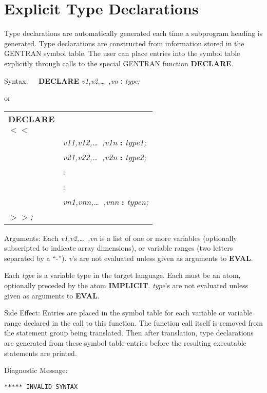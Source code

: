 \section{Explicit Type Declarations}
\label{explicit:type}
Type declarations are automatically generated each time a subprogram
heading is generated.  Type declarations are constructed
from information stored in the GENTRAN symbol table.  The user
can place entries into the symbol table explicitly through calls
to the special GENTRAN function {\bf DECLARE}.
\begin{describe}{Syntax:}
{\bf \ \ DECLARE} {\it v1,v2,\dots\  ,vn} {\bf :} {\it type;}

    or

\begin{tabular}{ll}
{\bf DECLARE}\\
{\bf $<$$<$}\\ 
&{\it v11,v12,\dots\  ,v1n} {\bf :} {\it type1;}\\
&{\it v21,v22,\dots\  ,v2n} {\bf :} {\it type2;}\\
& :\\
& :\\
&{\it vn1,vnn,\dots\  ,vnn} {\bf :} {\it typen;}\\ 
{\bf $>$$>$}{\it ;}
\end{tabular}
\end{describe}
\begin{describe}{Arguments:}
Each {\it v1,v2,\dots\  ,vn} is a list of one or more variables
(optionally subscripted to indicate array dimensions), or
variable ranges (two letters separated by a ``-'').  {\it v}'s are
not evaluated unless given as arguments to {\bf EVAL}.

Each {\it type} is a variable type in the target language.  Each
must be an atom, optionally preceded by the atom {\bf IMPLICIT}.
{\it type}'s are not evaluated unless given as arguments to {\bf EVAL}.
\end{describe}
\begin{describe}{Side Effect:}
Entries are placed in the symbol table for each variable or
variable range declared in the call to this function.  The function
call itself is removed from the statement group being
translated.  Then after translation, type declarations are
generated from these symbol table entries before the resulting
executable statements are printed.
\end{describe}
\begin{describe}{Diagnostic Message:}
\begin{verbatim}
***** INVALID SYNTAX
\end{verbatim}
\end{describe}
